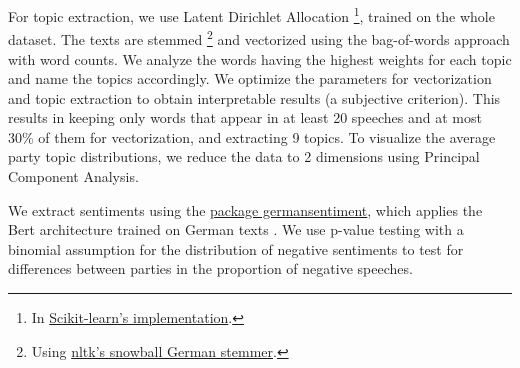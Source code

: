 \documentclass{article}
\begin{document}
For topic extraction, we use Latent Dirichlet Allocation
\footnote{In \href{https://scikit-learn.org/stable/modules/generated/sklearn.decomposition.LatentDirichletAllocation.html}{Scikit-learn's implementation}.},
trained on the whole dataset.
The texts are stemmed
\footnote{Using \href{https://www.nltk.org/_modules/nltk/stem/snowball.html}{nltk's snowball German stemmer}.}
and vectorized using the bag-of-words approach with word counts.
We analyze the words having the highest weights for each topic and name the topics accordingly.
We optimize the parameters for vectorization and topic extraction to obtain interpretable results (a subjective criterion).
This results in keeping only words that appear in at least 20 speeches and at most 30\% of them for vectorization, and extracting 9 topics.
To visualize the average party topic distributions, we reduce the data to 2 dimensions using Principal Component Analysis.

We extract sentiments using the \href{https://pypi.org/project/germansentiment/}{package germansentiment}, which applies the Bert architecture trained on German texts \cite{Germansentiment}.
We use p-value testing with a binomial assumption for the distribution of negative sentiments to test for differences between parties in the proportion of negative speeches.
\end{document}
